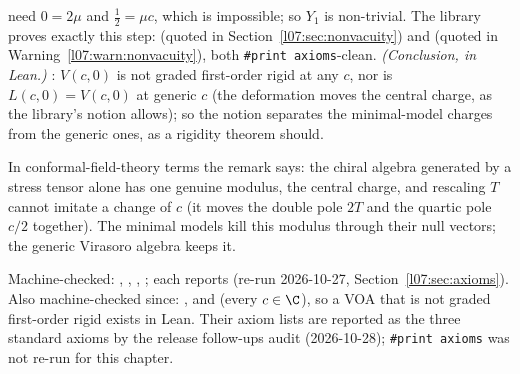 \begin{remark}
need $0 = 2\mu$ and $\frac12 = \mu c$, which is impossible; so $Y_1$ is non-trivial. The library proves exactly
this step:  (quoted in Section~\ref{l07:sec:nonvacuity}) and
 (quoted in Warning~\ref{l07:warn:nonvacuity}), both
\texttt{\#print axioms}-clean. \emph{(Conclusion, in Lean.)} \allowbreak{}\allowbreak{}\allowbreak{}\allowbreak{}: $V(c,0)$ is not graded
first-order rigid at any $c$, nor is $L(c,0) = V(c,0)$ at generic $c$ (the deformation moves the central charge, as the
library's notion allows); so the notion separates the minimal-model charges from the
generic ones, as a rigidity theorem should.
\end{remark}

\begin{physics}
In conformal-field-theory terms the remark says: the chiral algebra generated by a stress tensor alone has
one genuine modulus, the central charge, and rescaling $T$ cannot imitate a change of $c$ (it moves the
double pole $2T$ and the quartic pole $c/2$ together). The minimal models kill this modulus through their
null vectors; the generic Virasoro algebra keeps it.
\end{physics}

\begin{status}
Machine-checked: ,
, ,
; each reports  (re-run 2026-10-27, Section~\ref{l07:sec:axioms}). Also machine-checked since:
,  and
 (every $c\in\C$), so a VOA that is not graded first-order rigid
exists in Lean. Their axiom lists are reported as the three standard axioms by the release follow-ups audit
(2026-10-28); \texttt{\#print axioms} was not re-run for this chapter.
\end{status}

